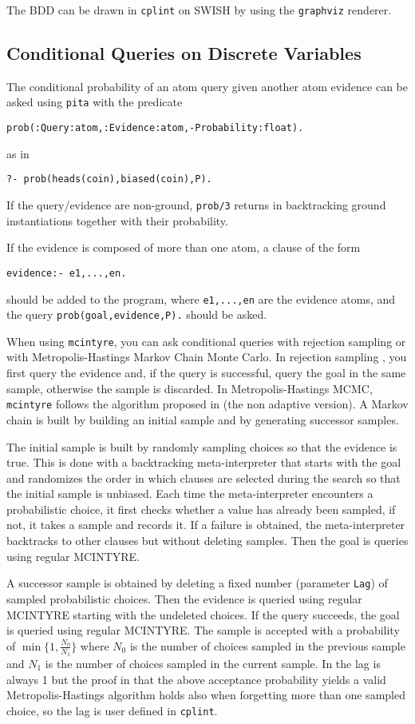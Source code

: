 The BDD can be drawn in \verb|cplint| on SWISH by using the \verb|graphviz| renderer.


\subsection{Conditional Queries on Discrete Variables}
\label{condq}
The conditional probability of an atom query given another atom evidence can be asked using \verb|pita| with the predicate 
\begin{verbatim}
prob(:Query:atom,:Evidence:atom,-Probability:float).
\end{verbatim}
as in
\begin{verbatim}
?- prob(heads(coin),biased(coin),P).
\end{verbatim}
If the query/evidence are non-ground, \verb|prob/3| returns in backtracking ground instantiations together with their probability.

If the evidence is composed of more than one atom, a clause of the form
\begin{verbatim}
evidence:- e1,...,en.
\end{verbatim}
should be added to the program, where \verb|e1,...,en| are the evidence atoms, and the query \verb|prob(goal,evidence,P).| should be asked.


When using \verb|mcintyre|, you can ask conditional queries with rejection sampling or with Metropolis-Hastings Markov Chain Monte Carlo.
In rejection sampling \cite{von195113}, you first query the evidence and, if the query is successful, query the goal in the same sample, otherwise
the sample is discarded.
In Metropolis-Hastings MCMC, \verb|mcintyre| follows the algorithm proposed in \cite{nampally2014adaptive} (the non adaptive version).
A Markov chain is built by building an initial sample and by generating successor samples.

The initial sample is built by  randomly sampling choices so that the evidence is true. This is done with
a backtracking meta-interpreter that starts with the goal and
randomizes the order in which clauses are selected during the search so that the initial sample is unbiased. Each time the meta-interpreter encounters 
a probabilistic choice, it first checks whether a
value has already been sampled, if not, it takes
a sample and records it. If a failure is obtained,
the meta-interpreter backtracks to other clauses but
without deleting samples. Then the goal is queries using 
regular MCINTYRE.

A successor sample is obtained by deleting a 
fixed number (parameter \verb|Lag|) of sampled probabilistic choices. Then the
evidence is queried using regular MCINTYRE starting with the undeleted choices.
If the query succeeds, the goal is queried using regular MCINTYRE.
The sample is accepted with a probability of $\min\{1,\frac{N_0}{N_1}\}$ where $N_0$ is the number of choices sampled
in the previous sample and $N_1$ is the number of choices sampled in the current sample.
In \cite{nampally2014adaptive} the lag is always 1 but the proof in \cite{nampally2014adaptive} that the above acceptance
probability yields a valid
Metropolis-Hastings algorithm holds also when forgetting more than one 
sampled choice, so the lag is 
user defined in \verb|cplint|.

